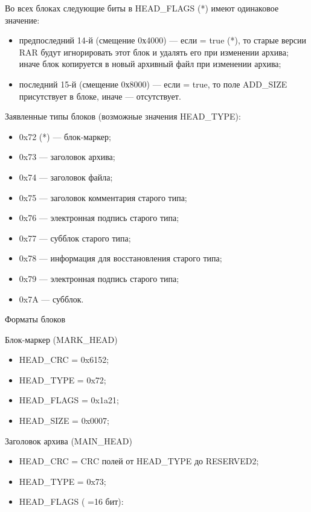 Во всех блоках следующие биты в HEAD\_FLAGS (*) имеют одинаковое значение:

\begin{itemize}
 \item предпоследний 14-й (смещение 0х4000) — если = true (*), то старые версии RAR будут игнорировать этот блок и удалять его при изменении архива; иначе блок копируется в новый архивный файл при изменении архива;
 \item последний 15-й (смещение 0х8000) — если = true, то поле ADD\_SIZE присутствует в блоке, иначе — отсутствует.
\end{itemize}
                
Заявленные типы блоков (возможные значения HEAD\_TYPE):

\begin{itemize}
\item 0x72 (*) — блок-маркер;
\item 0x73 — заголовок архива;
\item 0x74 — заголовок файла;
\item 0x75 — заголовок комментария старого типа;
\item 0x76 — электронная подпись старого типа;
\item 0x77 — субблок старого типа;
\item 0x78 — информация для восстановления старого типа;
\item 0x79 — электронная подпись старого типа;
\item 0x7A — субблок.
\end{itemize}

Форматы блоков

Блок-маркер (MARK\_HEAD)

\begin{itemize}
\item HEAD\_CRC = 0x6152;
\item HEAD\_TYPE = 0x72;
\item HEAD\_FLAGS = 0x1a21;
\item HEAD\_SIZE = 0x0007;
\end{itemize}

Заголовок архива (MAIN\_HEAD)
\begin{itemize}
\item HEAD\_CRC = CRC полей от HEAD\_TYPE до RESERVED2;
\item HEAD\_TYPE = 0x73;
\item HEAD\_FLAGS ( =16 бит):                     
\end{itemize}

